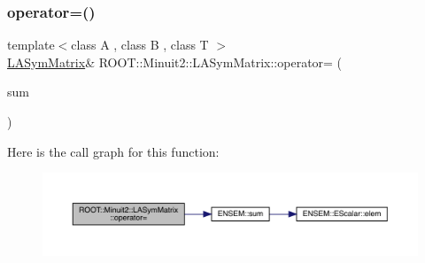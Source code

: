 \subsubsection{\texorpdfstring{operator=()}{operator=()}\hspace{0.1cm}{\footnotesize\ttfamily [7/14]}}
{\footnotesize\ttfamily template$<$class A , class B , class T $>$ \\
\mbox{\hyperlink{classROOT_1_1Minuit2_1_1LASymMatrix}{L\+A\+Sym\+Matrix}}\& R\+O\+O\+T\+::\+Minuit2\+::\+L\+A\+Sym\+Matrix\+::operator= (\begin{DoxyParamCaption}\item[{const \mbox{\hyperlink{classROOT_1_1Minuit2_1_1ABObj}{A\+B\+Obj}}$<$ \mbox{\hyperlink{classROOT_1_1Minuit2_1_1sym}{sym}}, \mbox{\hyperlink{classROOT_1_1Minuit2_1_1ABSum}{A\+B\+Sum}}$<$ \mbox{\hyperlink{classROOT_1_1Minuit2_1_1ABObj}{A\+B\+Obj}}$<$ \mbox{\hyperlink{classROOT_1_1Minuit2_1_1sym}{sym}}, A, T $>$, \mbox{\hyperlink{classROOT_1_1Minuit2_1_1ABObj}{A\+B\+Obj}}$<$ \mbox{\hyperlink{classROOT_1_1Minuit2_1_1sym}{sym}}, B, T $>$ $>$, T $>$ \&}]{sum }\end{DoxyParamCaption})\hspace{0.3cm}{\ttfamily [inline]}}

Here is the call graph for this function\+:
\nopagebreak
\begin{figure}[H]
\begin{center}
\leavevmode
\includegraphics[width=350pt]{d3/d72/classROOT_1_1Minuit2_1_1LASymMatrix_a88d40828624a6418f8b94e239e30d322_cgraph}
\end{center}
\end{figure}
\mbox{\label{classROOT_1_1Minuit2_1_1LASymMatrix_a88d40828624a6418f8b94e239e30d322}} 
